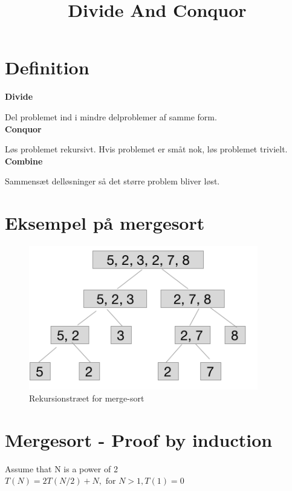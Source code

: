 \documentclass[]{article}
\begin{document}
\title{Divide And Conquor}
\maketitle
{\setlength{\parindent}{0 cm}

\section*{Definition}

\textbf{Divide}

Del problemet ind i mindre delproblemer af samme form.\\

\textbf{Conquor}

Løs problemet rekursivt. Hvis problemet er småt nok, løs problemet trivielt.\\

\textbf{Combine}

Sammensæt delløsninger så det større problem bliver løst.

\section*{Eksempel på mergesort}

\newpage
\begin{figure}
  \centering
  \includegraphics[width=10cm]{graphics/Mergesort Example.png}
  \caption{Rekursionstræet for merge-sort}
  \label{fig:mergeSortTree}
\end{figure}

\newpage

\section*{Mergesort - Proof by induction}
Assume that N is a power of 2\\

$T(N) = 2T(N/2) + N,$ $ \text{for } N > 1, T(1) = 0$

}
\end{document}
